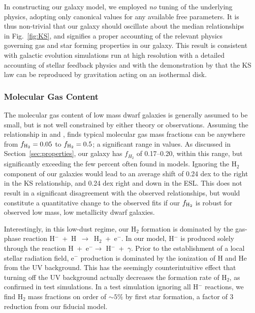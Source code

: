 \documentclass[twocolumn]{aastex61}
\begin{document}
In constructing our galaxy model, we employed \textit{no} tuning of the underlying physics, adopting only canonical values for any available free parameters. It is thus non-trivial that our galaxy should oscillate about the median relationships in Fig.~\ref{fig:KS}, and signifies a proper accounting of the relevant physics governing gas and star forming properties in our galaxy. This result is consistent with galactic evolution simulations run at high resolution with a detailed accounting of stellar feedback physics \citep[see ][ and references therein]{NaabOstriker2017} and with the demonstration by \citet{Li2005} that the KS law can be reproduced by gravitation acting on an isothermal disk. %

\subsubsection{Molecular Gas Content}
\label{sec:molecular gas content}

The molecular gas content of low mass dwarf galaxies is generally assumed
to be small, but is not well constrained by either theory or observations. Assuming the relationship in \citet{Leroy2013} and \citet{Momose2013}, \citet{Roychowdhury2014} finds typical molecular gas mass fractions can be anywhere from $f_{\rm H_2} = 0.05$ to $f_{\rm H_2} = 0.5$; a significant range in values. As discussed in Section~\ref{sec:properties}, our galaxy has $f_{H_2}$ of 0.17--0.20, within this range, but significantly exceeding the few percent often found in models. Ignoring the H$_2$ component of our galaxies would lead to an average shift of 0.24 dex to the right in the KS relationship, and 0.24 dex right and down in the ESL. This does not result in a significant disagreement with the observed relationships, but would constitute a quantitative change to the observed fits if our $f_{\rm H_2}$ is robust for observed low mass, low metallicity dwarf galaxies. 

Interestingly, in this low-dust regime, our H$_2$ formation is dominated by the gas-phase reaction H$^-$~+~H~$\rightarrow$~H$_2$~+~e$^{-}$. In our model, H$^{-}$ is produced solely through the reaction H~+~e$^{-} \rightarrow$ H$^{-}$~+~$\gamma$. Prior to the establishment of a local stellar radiation field, e$^{-}$ production is dominated by the ionization of H and He from the UV background. This has the seemingly counterintuitive effect that turning off the UV background actually decreases the formation rate of H$_2$, as confirmed in test simulations. In a test simulation ignoring all H$^{-}$ reactions, we find H$_{2}$ mass fractions on order of  $\sim 5\%$ by first star formation, a factor of 3 reduction from our fiducial model.
\end{document}
